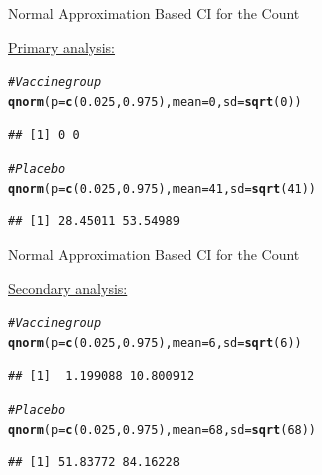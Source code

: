 \documentclass[10pt,handout]{beamer}\usepackage[]{graphicx}\usepackage[]{color}
\makeatletter
\newcommand{\hlnum}[1]{\textcolor[rgb]{0.686,0.059,0.569}{#1}}%
\newcommand{\hlcom}[1]{\textcolor[rgb]{0.678,0.584,0.686}{\textit{#1}}}%
\newcommand{\hlstd}[1]{\textcolor[rgb]{0.345,0.345,0.345}{#1}}%
\newcommand{\hlkwc}[1]{\textcolor[rgb]{0.333,0.667,0.333}{#1}}%
\newcommand{\hlkwd}[1]{\textcolor[rgb]{0.737,0.353,0.396}{\textbf{#1}}}%
\newenvironment{kframe}{%
 \def\at@end@of@kframe{}%
 \ifinner\ifhmode%
  \def\at@end@of@kframe{\end{minipage}}%
  \begin{minipage}{\columnwidth}%
 \fi\fi%
 \def\FrameCommand##1{\hskip\@totalleftmargin \hskip-\fboxsep
 \colorbox{shadecolor}{##1}\hskip-\fboxsep
     \hskip-\linewidth \hskip-\@totalleftmargin \hskip\columnwidth}%
 \MakeFramed {\advance\hsize-\width
   \@totalleftmargin\z@ \linewidth\hsize
   \@setminipage}}%
 {\par\unskip\endMakeFramed%
 \at@end@of@kframe}
\newenvironment{knitrout}{}{} %
\makeatother
\begin{document}
\begin{frame}[fragile]{Normal Approximation Based CI for the Count}
	
	\underline{Primary analysis:}
	\vspace{0.1in}
\begin{knitrout}\tiny
{}\color{fgcolor}\begin{kframe}
\begin{alltt}
\hlcom{# Vaccine group}
\hlkwd{qnorm}\hlstd{(}\hlkwc{p} \hlstd{=} \hlkwd{c}\hlstd{(}\hlnum{0.025}\hlstd{,} \hlnum{0.975}\hlstd{),} \hlkwc{mean} \hlstd{=} \hlnum{0}\hlstd{,} \hlkwc{sd} \hlstd{=} \hlkwd{sqrt}\hlstd{(}\hlnum{0}\hlstd{))}
\end{alltt}
\begin{verbatim}
## [1] 0 0
\end{verbatim}
\begin{alltt}
\hlcom{# Placebo}
\hlkwd{qnorm}\hlstd{(}\hlkwc{p} \hlstd{=} \hlkwd{c}\hlstd{(}\hlnum{0.025}\hlstd{,} \hlnum{0.975}\hlstd{),} \hlkwc{mean} \hlstd{=} \hlnum{41}\hlstd{,} \hlkwc{sd} \hlstd{=} \hlkwd{sqrt}\hlstd{(}\hlnum{41}\hlstd{))}
\end{alltt}
\begin{verbatim}
## [1] 28.45011 53.54989
\end{verbatim}
\end{kframe}
\end{knitrout}
	
\end{frame}

\begin{frame}[fragile]{Normal Approximation Based CI for the Count}
	
	\underline{Secondary analysis:}
	\vspace{0.1in}
\begin{knitrout}\tiny
{}\color{fgcolor}\begin{kframe}
\begin{alltt}
\hlcom{# Vaccine group}
\hlkwd{qnorm}\hlstd{(}\hlkwc{p} \hlstd{=} \hlkwd{c}\hlstd{(}\hlnum{0.025}\hlstd{,} \hlnum{0.975}\hlstd{),} \hlkwc{mean} \hlstd{=} \hlnum{6}\hlstd{,} \hlkwc{sd} \hlstd{=} \hlkwd{sqrt}\hlstd{(}\hlnum{6}\hlstd{))}
\end{alltt}
\begin{verbatim}
## [1]  1.199088 10.800912
\end{verbatim}
\begin{alltt}
\hlcom{# Placebo}
\hlkwd{qnorm}\hlstd{(}\hlkwc{p} \hlstd{=} \hlkwd{c}\hlstd{(}\hlnum{0.025}\hlstd{,} \hlnum{0.975}\hlstd{),} \hlkwc{mean} \hlstd{=} \hlnum{68}\hlstd{,} \hlkwc{sd} \hlstd{=} \hlkwd{sqrt}\hlstd{(}\hlnum{68}\hlstd{))}
\end{alltt}
\begin{verbatim}
## [1] 51.83772 84.16228
\end{verbatim}
\end{kframe}
\end{knitrout}
	
\end{frame}
\end{document}
